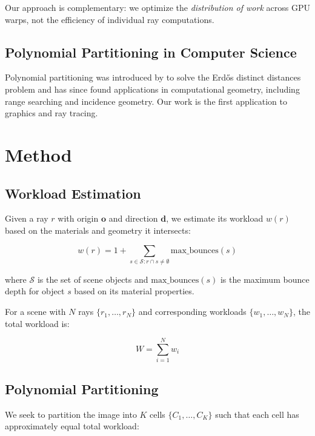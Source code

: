 \documentclass[11pt,a4paper]{article}
\begin{document}
Our approach is complementary: we optimize the \textit{distribution of work} across GPU warps, not the efficiency of individual ray computations.

\subsection{Polynomial Partitioning in Computer Science}

Polynomial partitioning was introduced by \citet{guth2010algebraic} to solve the Erdős distinct distances problem and has since found applications in computational geometry, including range searching and incidence geometry. Our work is the first application to graphics and ray tracing.

\section{Method}

\subsection{Workload Estimation}

Given a ray $r$ with origin $\mathbf{o}$ and direction $\mathbf{d}$, we estimate its workload $w(r)$ based on the materials and geometry it intersects:

\begin{equation}
w(r) = 1 + \sum_{s \in \mathcal{S} : r \cap s \neq \emptyset} \text{max\_bounces}(s)
\end{equation}

where $\mathcal{S}$ is the set of scene objects and $\text{max\_bounces}(s)$ is the maximum bounce depth for object $s$ based on its material properties.

For a scene with $N$ rays $\{r_1, \ldots, r_N\}$ and corresponding workloads $\{w_1, \ldots, w_N\}$, the total workload is:

\begin{equation}
W = \sum_{i=1}^{N} w_i
\end{equation}

\subsection{Polynomial Partitioning}

We seek to partition the image into $K$ cells $\{C_1, \ldots, C_K\}$ such that each cell has approximately equal total workload:
\end{document}
